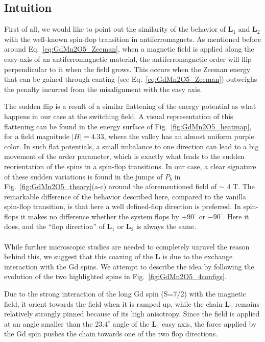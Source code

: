 \subsection{Intuition}
First of all, we would like to point out the similarity of the behavior of $\bm L_1$ and $\bm L_2$ with the well-known spin-flop transition in antiferromagnets.
As mentioned before around Eq.~\eqref{eq:GdMn2O5_Zeeman}, when a magnetic field is applied along the easy-axis of an antiferromagnetic material, the antiferromagnetic order will flip perpendicular to it when the field grows.
This occurs when the Zeeman energy that can be gained through canting (see Eq.~\eqref{eq:GdMn2O5_Zeeman}) outweighs the penalty incurred from the misalignment with the easy axis.

The sudden flip is a result of a similar flattening of the energy potential as what happens in our case at the switching field. A visual representation of this flattening can be found in the energy surface of Fig.~\ref{fig:GdMn2O5_heatmap}, for a field magnitude $|H| = 4.33$, where the valley has an almost uniform purple color.
In such flat potentials, a small imbalance to one direction can lead to a big movement of the order parameter, which is exactly what leads to the sudden reorientation of the spins in a spin-flop transitions.
In our case, a clear signature of these sudden variations is found in the jumps of $P_b$ in Fig.~\ref{fig:GdMn2O5_theory}(a-c) around the aforementioned field of $\sim$ 4 T.
The remarkable difference of the behavior described here, compared to the vanilla spin-flop transition, is that here a well defined-flop direction is preferred. In spin-flops it makes no difference whether the system flops by $+90^\circ$ or $-90^\circ$. Here it does, and the ``flop direction'' of $\bm L_1$ or $\bm L_2$ is always the same.
\\\\
While further microscopic studies are needed to completely unravel the reason behind this, we suggest that this coaxing of the $\bm L$ is due to the exchange interaction with the Gd spins. We attempt to describe the idea by following the evolution of the two highlighted spins in Fig.~\ref{fig:GdMn2O5_4configs}.

Due to the strong interaction of the long Gd spin (S=7/2) with the magnetic field, it orient towards the field when it is ramped up, while the chain $\bm L_1$ remains relatively strongly pinned because of its high anisotropy.
Since the field is applied at an angle smaller than the $23.4^\circ$ angle of the $\bm L_1$ easy axis, the force applied by the Gd spin pushes the chain towards one of the two flop directions.

